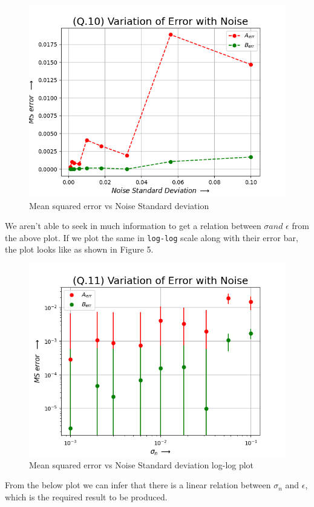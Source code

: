 \documentclass[11pt, a4paper]{article}
\begin{document}
\begin{figure}[!tbh]
   	\centering
   	\includegraphics[scale=0.8]{q10.png} 
   	\caption{Mean squared error vs Noise Standard deviation}
   	\label{fig:fig4}
   \end{figure} 

\newline
\newline
We aren't able to seek in much information to get a relation between $\sigma and$ $\epsilon$ from the above plot. If we plot the same in \texttt{log-log} scale along with their error bar, the plot looks like as shown in Figure 5.
\newline
\newline
\newline
\newline
\newline

\begin{figure}[!tbh]
   	\centering
   	\includegraphics[scale=0.8]{q11.png} 
   	\caption{Mean squared error vs Noise Standard deviation log-log plot}
   	\label{fig:fig5}
   \end{figure} 
 \newline
 From the below plot we can infer that there is a linear relation between $\sigma_n$ and $\epsilon$, which is the required result to be produced.
\end{document}
